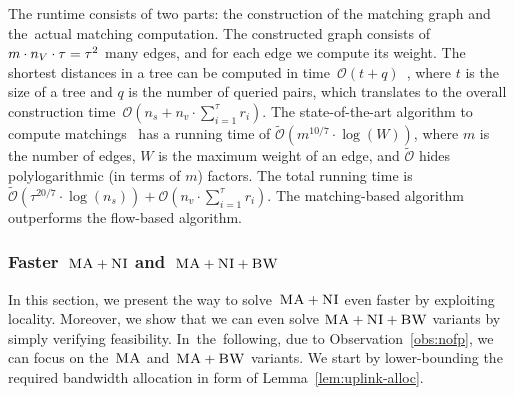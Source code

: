 The runtime consists of two parts: the construction of the matching graph and
the~actual matching computation. The constructed graph consists of
$m \cdot n_V \cdot \tau = \tau^2$
many edges,
and for each edge we compute its weight. The shortest distances
in a tree can be computed in time~$\mathcal{O}(t + q)$~\cite{offline-lca}, where $t$ is the size of a tree and $q$ is the number of queried pairs, which translates to the overall construction time~$\mathcal{O}(n_s + n_v\cdot \sum_{i=1}^\tau r_i)$.
The state-of-the-art algorithm to compute matchings~\cite{matching-best} has a running time of $\tilde{\mathcal{O}}(m^{10/7}\cdot \log(W))$, where $m$ is the number of edges, $W$ is the maximum weight of an edge, and $\tilde{\mathcal{O}}$ hides polylogarithmic (in terms of $m$) factors.
The total running time is $\tilde{\mathcal{O}}(\tau^{20/7}\cdot \log(n_s)) + \mathcal{O}(n_v\cdot \sum_{i=1}^\tau r_i)$.
The matching-based algorithm outperforms the flow-based algorithm.


\subsubsection{Faster~$\textsc{MA}+\textsc{NI}$ and~$\textsc{MA}+\textsc{NI}+\textsc{BW}$}

In this section, we present the way to solve~$\textsc{MA}+\textsc{NI}$ even faster by exploiting
locality. Moreover, we show that we can
even solve
$\textsc{MA}+\textsc{NI}+\textsc{BW}$ variants by simply
verifying feasibility.
In~the~following, due to Observation~\ref{obs:nofp}, we can focus on
the~$\textsc{MA}$ and~$\textsc{MA}+\textsc{BW}$ variants.
We start by lower-bounding the required bandwidth allocation in form of Lemma~\ref{lem:uplink-alloc}.

%
%


